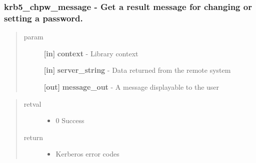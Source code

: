 \documentclass[letterpaper,10pt,english]{sphinxmanual}
\begin{document}
\subsubsection{krb5\_chpw\_message -  Get a result message for changing or setting a password.}
\label{appdev/refs/api/krb5_chpw_message:krb5-chpw-message-get-a-result-message-for-changing-or-setting-a-password}\label{appdev/refs/api/krb5_chpw_message::doc}

\begin{fulllineitems}
\label{appdev/refs/api/krb5_chpw_message:c.krb5_chpw_message}
\end{fulllineitems}

\begin{quote}\begin{description}
\item[{param}] \leavevmode
\textbf{{[}in{]}} \textbf{context} - Library context

\textbf{{[}in{]}} \textbf{server\_string} - Data returned from the remote system

\textbf{{[}out{]}} \textbf{message\_out} - A message displayable to the user

\end{description}\end{quote}
\begin{quote}\begin{description}
\item[{retval}] \leavevmode\begin{itemize}
\item {} 
0   Success

\end{itemize}

\item[{return}] \leavevmode\begin{itemize}
\item {} 
Kerberos error codes

\end{itemize}

\end{description}\end{quote}
\end{document}
